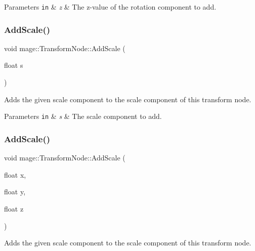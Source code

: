 \begin{DoxyParams}[1]{Parameters}
\mbox{\tt in}  & {\em z} & The z-\/value of the rotation component to add. \\
\hline
\end{DoxyParams}
\hypertarget{classmage_1_1_transform_node_a819b084b2907f629d0cfd47a279daca6}{}\label{classmage_1_1_transform_node_a819b084b2907f629d0cfd47a279daca6} 
\subsubsection{\texorpdfstring{Add\+Scale()}{AddScale()}\hspace{0.1cm}{\footnotesize\ttfamily [1/4]}}
{\footnotesize\ttfamily void mage\+::\+Transform\+Node\+::\+Add\+Scale (\begin{DoxyParamCaption}\item[{float}]{s }\end{DoxyParamCaption})}

Adds the given scale component to the scale component of this transform node.


\begin{DoxyParams}[1]{Parameters}
\mbox{\tt in}  & {\em s} & The scale component to add. \\
\hline
\end{DoxyParams}
\hypertarget{classmage_1_1_transform_node_af77e42c0d780c47e89000b789e3e44a0}{}\label{classmage_1_1_transform_node_af77e42c0d780c47e89000b789e3e44a0} 
\subsubsection{\texorpdfstring{Add\+Scale()}{AddScale()}\hspace{0.1cm}{\footnotesize\ttfamily [2/4]}}
{\footnotesize\ttfamily void mage\+::\+Transform\+Node\+::\+Add\+Scale (\begin{DoxyParamCaption}\item[{float}]{x,  }\item[{float}]{y,  }\item[{float}]{z }\end{DoxyParamCaption})}

Adds the given scale component to the scale component of this transform node.



